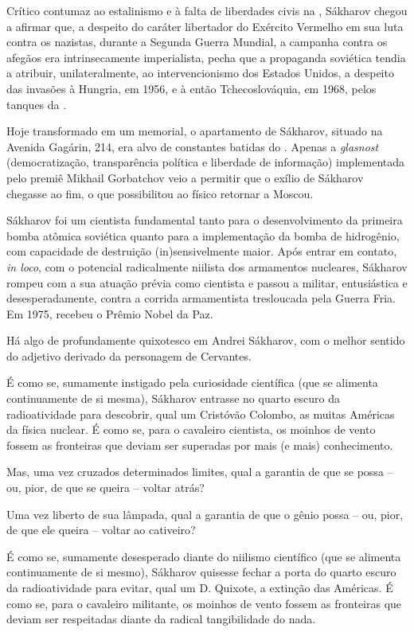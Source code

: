 Crítico contumaz ao estalinismo e à falta de liberdades civis na ,
Sákharov chegou a afirmar que, a despeito do caráter libertador do
Exército Vermelho em sua luta contra os nazistas, durante a Segunda
Guerra Mundial, a campanha contra os afegãos era intrinsecamente
imperialista, pecha que a propaganda soviética tendia a atribuir,
unilateralmente, ao intervencionismo dos Estados Unidos, a despeito das
invasões à Hungria, em 1956, e à então Tchecoslováquia, em 1968, pelos
tanques da .

Hoje transformado em um memorial, o apartamento de Sákharov, situado na
Avenida Gagárin, 214, era alvo de constantes batidas do . Apenas a
\emph{glasnost} (democratização, transparência política e liberdade de
informação) implementada pelo premiê Mikhail Gorbatchov veio a permitir
que o exílio de Sákharov chegasse ao fim, o que possibilitou ao físico
retornar a Moscou.

Sákharov foi um cientista fundamental tanto para o desenvolvimento da
primeira bomba atômica soviética quanto para a implementação da bomba de
hidrogênio, com capacidade de destruição (in)sensivelmente maior. Após
entrar em contato, \emph{in loco}, com o potencial radicalmente niilista
dos armamentos nucleares, Sákharov rompeu com a sua atuação prévia como
cientista e passou a militar, entusiástica e desesperadamente, contra a
corrida armamentista tresloucada pela Guerra Fria. Em 1975, recebeu o
Prêmio Nobel da Paz.

Há algo de profundamente quixotesco em Andrei Sákharov, com o melhor
sentido do adjetivo derivado da personagem de Cervantes.

É como se, sumamente instigado pela curiosidade científica (que se
alimenta continuamente de si mesma), Sákharov entrasse no quarto escuro
da radioatividade para descobrir, qual um Cristóvão Colombo, as muitas
Américas da física nuclear. É como se, para o cavaleiro cientista, os
moinhos de vento fossem as fronteiras que deviam ser superadas por mais
(e mais) conhecimento.

Mas, uma vez cruzados determinados limites, qual a garantia de que se
possa -- ou, pior, de que se queira -- voltar atrás?

Uma vez liberto de sua lâmpada, qual a garantia de que o gênio possa --
ou, pior, de que ele queira -- voltar ao cativeiro?

É como se, sumamente desesperado diante do niilismo científico (que se
alimenta continuamente de si mesmo), Sákharov quisesse fechar a porta do
quarto escuro da radioatividade para evitar, qual um D. Quixote, a
extinção das Américas. É como se, para o cavaleiro militante, os moinhos
de vento fossem as fronteiras que deviam ser respeitadas diante da
radical tangibilidade do nada.

